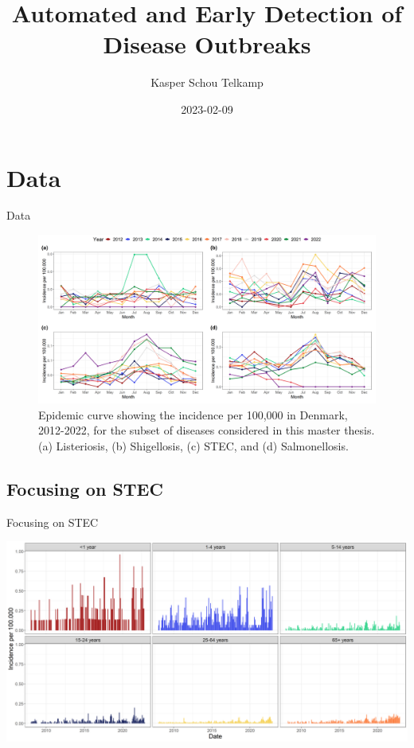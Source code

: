 \documentclass[aspectratio=169]{beamer}
\title[Automated and Early Detection of Disease Outbreaks]{Automated and
Early Detection of Disease Outbreaks}
\author{Kasper Schou Telkamp}
\institute{Section for Dynamical Systems}
\date{2023-02-09}
\begin{document}
\frame{
	\maketitle
}


\hypertarget{data}{%
\section{Data}\label{data}}

\begin{frame}{Data}
\tiny

\begin{figure}[H]
\includegraphics[width=0.8\linewidth]{../figures/EpiPlot} \caption{Epidemic curve showing the incidence per 100,000 in Denmark, 2012-2022, for the subset of diseases considered in this master thesis. (a) Listeriosis, (b) Shigellosis, (c) STEC, and (d) Salmonellosis.}\label{fig:EpiPlot}
\end{figure}

\normalsize
\end{frame}

\hypertarget{focusing-on-stec}{%
\subsection{Focusing on STEC}\label{focusing-on-stec}}

\begin{frame}{Focusing on STEC}
\tiny

\includegraphics[width=1\linewidth]{../figures/STEC_long_plot}

\normalsize
\end{frame}
\end{document}
